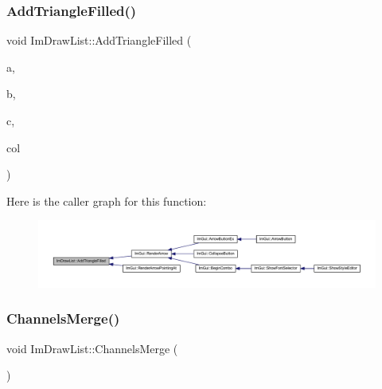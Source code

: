 \mbox{\label{struct_im_draw_list_a2395370cf2dab19fce3c0e2542cd4f25}} 
\subsubsection{\texorpdfstring{Add\+Triangle\+Filled()}{AddTriangleFilled()}}
{\footnotesize\ttfamily void Im\+Draw\+List\+::\+Add\+Triangle\+Filled (\begin{DoxyParamCaption}\item[{const \mbox{\hyperlink{struct_im_vec2}{Im\+Vec2}} \&}]{a,  }\item[{const \mbox{\hyperlink{struct_im_vec2}{Im\+Vec2}} \&}]{b,  }\item[{const \mbox{\hyperlink{struct_im_vec2}{Im\+Vec2}} \&}]{c,  }\item[{\mbox{\hyperlink{imgui_8h_a118cff4eeb8d00e7d07ce3d6460eed36}{Im\+U32}}}]{col }\end{DoxyParamCaption})}

Here is the caller graph for this function\+:
\nopagebreak
\begin{figure}[H]
\begin{center}
\leavevmode
\includegraphics[width=350pt]{struct_im_draw_list_a2395370cf2dab19fce3c0e2542cd4f25_icgraph}
\end{center}
\end{figure}
\mbox{\label{struct_im_draw_list_a2ed82c3f663cda520c90c55b94196274}} 
\subsubsection{\texorpdfstring{Channels\+Merge()}{ChannelsMerge()}}
{\footnotesize\ttfamily void Im\+Draw\+List\+::\+Channels\+Merge (\begin{DoxyParamCaption}{ }\end{DoxyParamCaption})}

